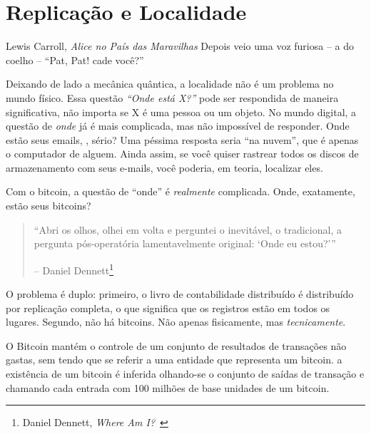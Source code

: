 \chapter{Replicação e Localidade}
\label{les:3}

\begin{chapquote}{Lewis Carroll, \textit{Alice no País das Maravilhas}}
Depois veio uma voz furiosa -- a do coelho -- \enquote{Pat, Pat! cade você?}
\end{chapquote}

Deixando de lado a mecânica quântica, a localidade não é um problema no mundo físico.
Essa questão \textit{\enquote{Onde está X?}} pode ser respondida de maneira significativa, não
importa se X é uma pessoa ou um objeto. No mundo digital, a questão de
 \textit{onde} já é mais complicada, mas não impossível de responder. Onde estão seus emails,
, sério? Uma péssima resposta seria \enquote{na nuvem},  que é
apenas o computador de alguem. Ainda assim, se você quiser rastrear todos os
discos de armazenamento com seus e-mails, você poderia, em teoria, localizar
eles.

Com o bitcoin, a questão de \enquote{onde} é \textit{realmente} complicada. Onde,
exatamente, estão seus bitcoins?

\begin{quotation}\begin{samepage}
\enquote{Abri os olhos, olhei em volta e perguntei o inevitável, o
tradicional, a pergunta pós-operatória lamentavelmente original: `Onde
eu estou?'}
\begin{flushright} -- Daniel Dennett\footnote{Daniel Dennett, \textit{Where Am I?}~\cite{where-am-i}}
\end{flushright}\end{samepage}\end{quotation}

O problema é duplo: primeiro, o livro de contabilidade distribuído é distribuído por
replicação completa, o que significa que os registros estão em todos os lugares. Segundo, não há
bitcoins. Não apenas fisicamente, mas \textit{tecnicamente}.

O Bitcoin mantém o controle de um conjunto de resultados de transações não gastas, sem
tendo que se referir a uma entidade que representa um bitcoin.  a existência de um bitcoin 
é inferida olhando-se o conjunto de saídas de transação e chamando cada entrada com 100 milhões de base
unidades de um bitcoin.

